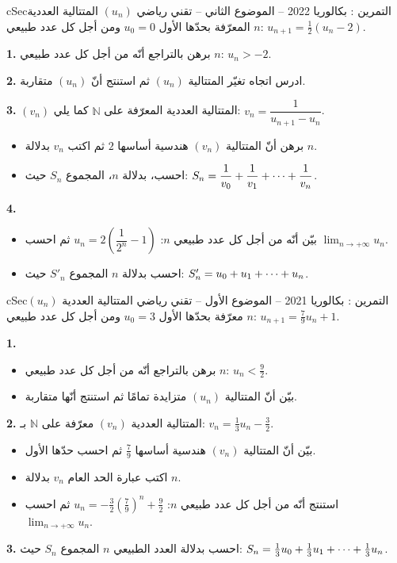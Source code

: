 \documentclass[12pt,a4paper]{article}
\newenvironment{BOX}[2]{\begin{otherlanguage}{english}\begin{arbox}{#1}{#2}}{\end{arbox}\end{otherlanguage}}
\newcounter{exo}
\newenvironment{tamrin}[1]{\stepcounter{exo}\begin{BOX}{cSec}{التمرين \theexo: #1}}{\end{BOX}}
\renewcommand{\cdots}{\mathinner{\cdotp\cdotp\cdotp}}
\newcommand{\N}{\mathbb{N}}
\newcommand{\limn}{\displaystyle\lim_{n\to+\infty}}
\newenvironment{sq}{\begin{itemize}[leftmargin=2.4em,itemsep=3pt]}{\end{itemize}}
\newcommand{\qa}{\item[(أ)]}\newcommand{\qb}{\item[(ب)]}\newcommand{\qc}{\item[(جـ)]}\newcommand{\qd}{\item[(د)]}\newcommand{\qe}{\item[(هـ)]}
\begin{document}
\begin{tamrin}{بكالوريا 2022 -- الموضوع الثاني -- تقني رياضي}
$(u_n)$ المتتالية العددية المعرّفة بحدّها الأول $u_0=0$ ومن أجل كل عدد طبيعي $n$: $u_{n+1}=\frac12\left(u_n-2\right)$.

\textbf{1.} برهن بالتراجع أنّه من أجل كل عدد طبيعي $n$: $u_n>-2$.

\textbf{2.} ادرس اتجاه تغيّر المتتالية $(u_n)$ ثم استنتج أنّ $(u_n)$ متقاربة.

\textbf{3.} $(v_n)$ المتتالية العددية المعرّفة على $\N$ كما يلي: $v_n=\dfrac{1}{u_{n+1}-u_n}$.
\begin{sq}
\qa برهن أنّ المتتالية $(v_n)$ هندسية أساسها $2$ ثم اكتب $v_n$ بدلالة $n$.
\qb احسب، بدلالة $n$، المجموع $S_n$ حيث: $S_n=\dfrac{1}{v_0}+\dfrac{1}{v_1}+\cdots+\dfrac{1}{v_n}$.
\end{sq}
\textbf{4.}
\begin{sq}
\qa بيّن أنّه من أجل كل عدد طبيعي $n$: $u_n=2\left(\dfrac{1}{2^n}-1\right)$ ثم احسب $\limn u_n$.
\qb احسب بدلالة $n$ المجموع $S'_n$ حيث: $S'_n=u_0+u_1+\cdots+u_n$.
\end{sq}
\end{tamrin}

\begin{tamrin}{بكالوريا 2021 -- الموضوع الأول -- تقني رياضي}
المتتالية العددية $(u_n)$ معرّفة بحدّها الأول $u_0=3$ ومن أجل كل عدد طبيعي $n$: $u_{n+1}=\frac79u_n+1$.

\textbf{1.}
\begin{sq}
\qa برهن بالتراجع أنّه من أجل كل عدد طبيعي $n$: $u_n<\frac92$.
\qb بيّن أنّ المتتالية $(u_n)$ متزايدة تمامًا ثم استنتج أنّها متقاربة.
\end{sq}
\textbf{2.} المتتالية العددية $(v_n)$ معرّفة على $\N$ بـ: $v_n=\frac13u_n-\frac32$.
\begin{sq}
\qa بيّن أنّ المتتالية $(v_n)$ هندسية أساسها $\frac79$ ثم احسب حدّها الأول.
\qb اكتب عبارة الحد العام $v_n$ بدلالة $n$.
\qc استنتج أنّه من أجل كل عدد طبيعي $n$: $u_n=-\frac32\left(\frac79\right)^n+\frac92$ ثم احسب $\limn u_n$.
\end{sq}
\textbf{3.} احسب بدلالة العدد الطبيعي $n$ المجموع $S_n$ حيث: $S_n=\frac13u_0+\frac13u_1+\cdots+\frac13u_n$.
\end{tamrin}
\end{document}
